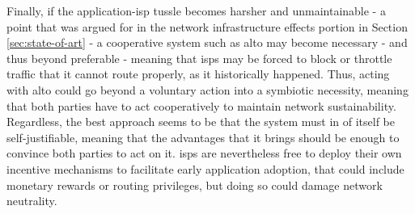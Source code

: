     Finally, if the application-\gls{isp} tussle becomes harsher and unmaintainable - a point that was argued for in the network infrastructure effects portion in Section \ref{sec:state-of-art} - a cooperative system such as \gls{alto} may become necessary - and thus beyond preferable - meaning that \glspl{isp} may be forced to block or throttle traffic that it cannot route properly, as it historically happened.
    Thus, acting with \gls{alto} could go beyond a voluntary action into a symbiotic necessity, meaning that both parties have to act cooperatively to maintain network sustainability.
    Regardless, the best approach seems to be that the system must in of itself be self-justifiable, meaning that the advantages that it brings should be enough to convince both parties to act on it.
    \glspl{isp} are nevertheless free to deploy their own incentive mechanisms to facilitate early application adoption, that could include monetary rewards or routing privileges, but doing so could damage network neutrality.

